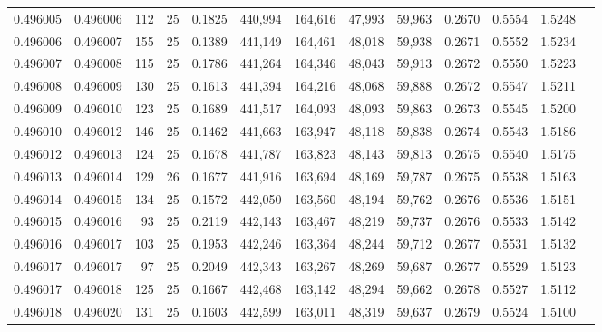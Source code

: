 \begin{tabular}{rrrrrrrrrrrrr}
0.496005 & 0.496006 &   112 &  25 &                                     0.1825 & 440,994 & 164,616 &  47,993 &  59,963 & 0.2670 & 0.5554 & 1.5248 \\
0.496006 & 0.496007 &   155 &  25 &                                     0.1389 & 441,149 & 164,461 &  48,018 &  59,938 & 0.2671 & 0.5552 & 1.5234 \\
0.496007 & 0.496008 &   115 &  25 &                                     0.1786 & 441,264 & 164,346 &  48,043 &  59,913 & 0.2672 & 0.5550 & 1.5223 \\
0.496008 & 0.496009 &   130 &  25 &                                     0.1613 & 441,394 & 164,216 &  48,068 &  59,888 & 0.2672 & 0.5547 & 1.5211 \\
0.496009 & 0.496010 &   123 &  25 &                                     0.1689 & 441,517 & 164,093 &  48,093 &  59,863 & 0.2673 & 0.5545 & 1.5200 \\
0.496010 & 0.496012 &   146 &  25 &                                     0.1462 & 441,663 & 163,947 &  48,118 &  59,838 & 0.2674 & 0.5543 & 1.5186 \\
0.496012 & 0.496013 &   124 &  25 &                                     0.1678 & 441,787 & 163,823 &  48,143 &  59,813 & 0.2675 & 0.5540 & 1.5175 \\
0.496013 & 0.496014 &   129 &  26 &                                     0.1677 & 441,916 & 163,694 &  48,169 &  59,787 & 0.2675 & 0.5538 & 1.5163 \\
0.496014 & 0.496015 &   134 &  25 &                                     0.1572 & 442,050 & 163,560 &  48,194 &  59,762 & 0.2676 & 0.5536 & 1.5151 \\
0.496015 & 0.496016 &    93 &  25 &                                     0.2119 & 442,143 & 163,467 &  48,219 &  59,737 & 0.2676 & 0.5533 & 1.5142 \\
0.496016 & 0.496017 &   103 &  25 &                                     0.1953 & 442,246 & 163,364 &  48,244 &  59,712 & 0.2677 & 0.5531 & 1.5132 \\
0.496017 & 0.496017 &    97 &  25 &                                     0.2049 & 442,343 & 163,267 &  48,269 &  59,687 & 0.2677 & 0.5529 & 1.5123 \\
0.496017 & 0.496018 &   125 &  25 &                                     0.1667 & 442,468 & 163,142 &  48,294 &  59,662 & 0.2678 & 0.5527 & 1.5112 \\
0.496018 & 0.496020 &   131 &  25 &                                     0.1603 & 442,599 & 163,011 &  48,319 &  59,637 & 0.2679 & 0.5524 & 1.5100 \\

\end{tabular}
